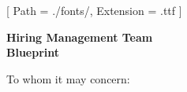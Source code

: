 


\renewcommand{\photo}[2]{}

\geometry{
  left=2cm,
  right=2cm,
  top=2cm,
  bottom=2cm
}



\makecvheader

\setmainfont{NotoSans-Regular}[
  Path = ./fonts/,
  Extension = .ttf
]

\vspace{1cm}
\indent\textbf{Hiring Management Team}\\
\indent\textbf{Blueprint}

\vspace{0.5cm}

\noindent To whom it may concern:

\vspace{0.5cm}

